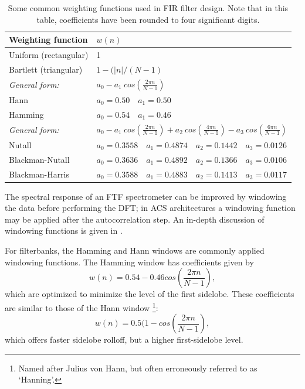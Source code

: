 \documentclass{ws-rv961x669}
\begin{document}
\begin{table}
	\caption{Some common weighting functions used in FIR filter design. Note that in this table, coefficients have been rounded to four significant digits. \label{tab:adc}}
	\begin{tabular}{l l }
	\hline
	Weighting function      & $w(n)$                        			\\
	\hline
	\hline
	Uniform  (rectangular)   &  1                           			\\
	Bartlett (triangular)    &  $1 - (|n| / (N-1)$               	\\
	\hline
	\emph{General form:}    & $a_0 - a_1~cos(\frac{2\pi n}{N-1})$ \\
	Hann                     & $a_0=0.50 \quad a_1 = 0.50$ 	\\
	Hamming             & $ a_0 = 0.54 \quad a_1 = 0.46$   	\\
	\hline
	
	 \emph{General form:} &$a_0 - a_1~cos(\frac{2\pi n}{N-1}) + a_2~cos(\frac{4\pi n}{N-1}) -
	 					   a_3~cos(\frac{6\pi n}{N-1}) $	 \\
	 Nutall          & $a_0=0.3558\quad a_1=0.4874\quad a_2=0.1442\quad a_3=0.0126$ \\
	 Blackman-Nutall & $a_0=0.3636\quad a_1=0.4892\quad a_2=0.1366\quad a_3=0.0106$ \\
	 Blackman-Harris & $a_0=0.3588\quad a_1=0.4883\quad a_2=0.1413\quad a_3=0.0117$ \\
	\hline
	\end{tabular}

\end{table}

The spectral response of an FTF spectrometer can be improved by windowing the data before performing the DFT; in ACS architectures a windowing function may be applied after the autocorrelation step. An in-depth discussion of windowing functions is given in \citet{SvenGade1987}. 

For filterbanks, the Hamming and Hann windows are commonly applied windowing functions. The Hamming window has coefficients given by
\begin{equation}
w(n)=\mbox{0.54}-\mbox{0.46}cos\left(\frac{\mbox{2}\pi n}{N-1}\right),
\end{equation}
which are optimized to minimize the level of the first sidelobe. These coefficients are similar to those of the Hann window%
\footnote{Named after Julius von Hann, but often erroneously referred to as
`Hanning'.%
}:
\begin{equation}
w(n)=\mbox{0.5}(\mbox{1}-cos\left(\frac{\mbox{2}\pi n}{N-1}\right),
\end{equation}
which offers faster sidelobe rolloff, but a higher first-sidelobe
level. 
\end{document}
